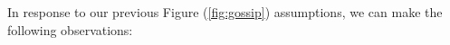     \noindent
    In response to our previous Figure (\ref{fig:gossip}) assumptions, we can make the following observations:
   
    


